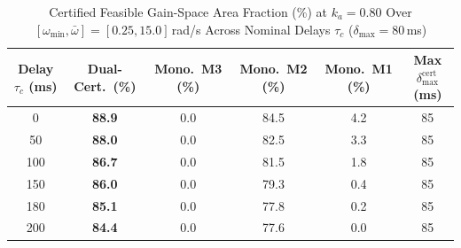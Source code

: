 \begin{table}[t]
\centering
\caption{Certified Feasible Gain-Space Area Fraction (\%) at $k_a = 0.80$ Over $[\omega_{\min}, \bar{\omega}] = [0.25, 15.0]$\,rad/s Across Nominal Delays $\tau_c$ ($\delta_{\max}=80$\,ms)}
\label{tab:delay_robustness}
\begin{tabular}{cccccc}
\toprule
Delay $\tau_c$ (ms) & Dual-Cert.\ (\%) & Mono.\ M3 (\%) & Mono.\ M2 (\%) & Mono.\ M1 (\%) & Max $\delta_{\max}^{\mathrm{cert}}$ (ms) \\
\midrule
0 & \textbf{88.9} & 0.0 & 84.5 & 4.2 & 85 \\
50 & \textbf{88.0} & 0.0 & 82.5 & 3.3 & 85 \\
100 & \textbf{86.7} & 0.0 & 81.5 & 1.8 & 85 \\
150 & \textbf{86.0} & 0.0 & 79.3 & 0.4 & 85 \\
180 & \textbf{85.1} & 0.0 & 77.8 & 0.2 & 85 \\
200 & \textbf{84.4} & 0.0 & 77.6 & 0.0 & 85 \\
\bottomrule
\end{tabular}
\end{table}
